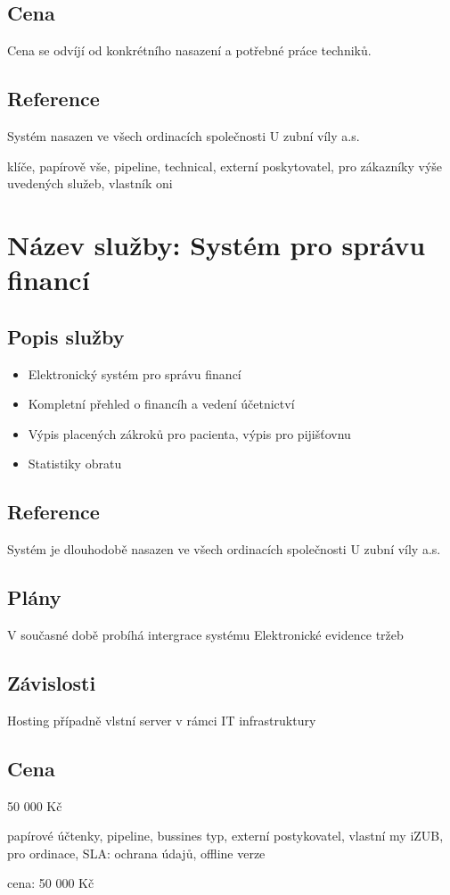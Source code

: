 \documentclass[12pt, a4paper, titlepage]{article}
\begin{document}
	\subsection*{Cena}
	Cena se odvíjí od konkrétního nasazení a potřebné práce techniků.

	\subsection*{Reference}
	Systém nasazen ve všech ordinacích společnosti U zubní víly a.s.


	klíče, papírově vše, pipeline, technical, externí poskytovatel, pro zákazníky výše uvedených služeb,
	vlastník oni

	\newpage

	\noindent\makebox[\linewidth]{\rule{16cm}{0.4pt}}

	\section*{Název služby: Systém pro správu financí}

	\subsection*{Popis služby}
	\begin{itemize}
		\item Elektronický systém pro správu financí
		\item Kompletní přehled o financíh a vedení účetnictví
		\item Výpis placených zákroků pro pacienta, výpis pro pijišťovnu
		\item Statistiky obratu
	\end{itemize}

	\subsection*{Reference}
	Systém je dlouhodobě nasazen ve všech ordinacích společnosti U zubní víly a.s.

	\subsection*{Plány}
	V současné době probíhá intergrace systému Elektronické evidence tržeb

	\subsection*{Závislosti}
	Hosting případně vlstní server v rámci IT infrastruktury

	\subsection*{Cena}
	50 000 Kč

	papírové účtenky, pipeline, bussines typ, externí postykovatel, vlastní my iZUB, pro ordinace,
	SLA:
		ochrana údajů, offline verze

	cena:
		50 000 Kč
\end{document}

